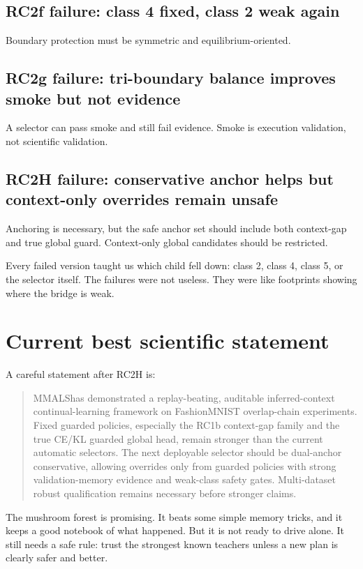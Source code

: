\documentclass[11pt]{article}
\newcommand{\mmals}{\textsc{MMALS}}
\begin{document}
\subsection{RC2f failure: class 4 fixed, class 2 weak again}
Boundary protection must be symmetric and equilibrium-oriented.

\subsection{RC2g failure: tri-boundary balance improves smoke but not evidence}
A selector can pass smoke and still fail evidence. Smoke is execution validation, not scientific validation.

\subsection{RC2H failure: conservative anchor helps but context-only overrides remain unsafe}
Anchoring is necessary, but the safe anchor set should include both context-gap and true global guard. Context-only global candidates should be restricted.

\begin{kidbox}
Every failed version taught us which child fell down: class 2, class 4, class 5, or the selector itself. The failures were not useless. They were like footprints showing where the bridge is weak.
\end{kidbox}

\section{Current best scientific statement}

A careful statement after RC2H is:

\begin{quote}
\mmals has demonstrated a replay-beating, auditable inferred-context continual-learning framework on FashionMNIST overlap-chain experiments. Fixed guarded policies, especially the RC1b context-gap family and the true CE/KL guarded global head, remain stronger than the current automatic selectors. The next deployable selector should be dual-anchor conservative, allowing overrides only from guarded policies with strong validation-memory evidence and weak-class safety gates. Multi-dataset robust qualification remains necessary before stronger claims.
\end{quote}

\begin{kidbox}
The mushroom forest is promising. It beats some simple memory tricks, and it keeps a good notebook of what happened. But it is not ready to drive alone. It still needs a safe rule: trust the strongest known teachers unless a new plan is clearly safer and better.
\end{kidbox}
\end{document}
